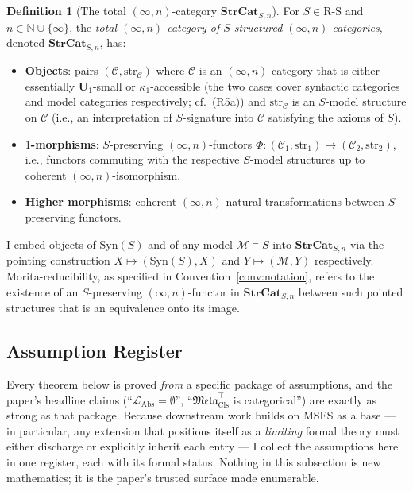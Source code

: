 \documentclass[11pt]{article}
\theoremstyle{plain}
\theoremstyle{definition}
\newtheorem{definition}[theorem]{Definition}
\newcommand{\RS}{\mathrm{R\text{-}S}}
\newcommand{\cM}{\mathcal{M}}
\newcommand{\cC}{\mathcal{C}}
\newcommand{\Meta}{\mathfrak{Meta}}
\newcommand{\LAbs}{\mathcal{L}_{\mathrm{Abs}}}
\newcommand{\Syn}{\mathrm{Syn}}
\begin{document}
\begin{definition}[The total $(\infty, n)$-category $\mathbf{StrCat}_{S, n}$]\label{def:strcat}
For $S \in \RS$ and $n \in \mathbb{N} \cup \{\infty\}$, the \emph{total $(\infty, n)$-category of $S$-structured $(\infty, n)$-categories}, denoted $\mathbf{StrCat}_{S, n}$, has:
\begin{itemize}
\item \textbf{Objects}: pairs $(\cC, \mathrm{str}_\cC)$ where $\cC$ is an $(\infty, n)$-category that is either essentially $\mathbf{U}_1$-small or $\kappa_1$-accessible (the two cases cover syntactic categories and model categories respectively; cf.\ (R5a)) and $\mathrm{str}_\cC$ is an $S$-model structure on $\cC$ (i.e., an interpretation of $S$-signature into $\cC$ satisfying the axioms of $S$).
\item \textbf{$1$-morphisms}: $S$-preserving $(\infty, n)$-functors $\Phi : (\cC_1, \mathrm{str}_1) \to (\cC_2, \mathrm{str}_2)$, i.e., functors commuting with the respective $S$-model structures up to coherent $(\infty, n)$-isomorphism.
\item \textbf{Higher morphisms}: coherent $(\infty, n)$-natural transformations between $S$-preserving functors.
\end{itemize}
I embed objects of $\Syn(S)$ and of any model $\cM \models S$ into $\mathbf{StrCat}_{S, n}$ via the pointing construction $X \mapsto (\Syn(S), X)$ and $Y \mapsto (\cM, Y)$ respectively. Morita-reducibility, as specified in Convention~\ref{conv:notation}, refers to the existence of an $S$-preserving $(\infty, n)$-functor in $\mathbf{StrCat}_{S, n}$ between such pointed structures that is an equivalence onto its image.
\end{definition}

\subsection{Assumption Register}\label{sec:assumption-register}

Every theorem below is proved \emph{from} a specific package of assumptions, and the paper's headline claims (``$\LAbs = \emptyset$'', ``$\Meta_{\mathrm{Cls}}^{\top}$ is categorical'') are exactly as strong as that package. Because downstream work builds on MSFS as a base --- in particular, any extension that positions itself as a \emph{limiting} formal theory must either discharge or explicitly inherit each entry --- I collect the assumptions here in one register, each with its formal status. Nothing in this subsection is new mathematics; it is the paper's trusted surface made enumerable.
\end{document}
